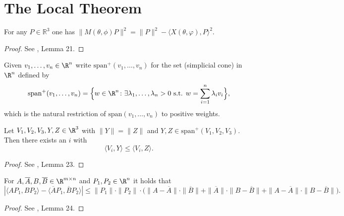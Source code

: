 \chapter{The Local Theorem}

\begin{lemma} \label{lem:pythagoras}
  \leanok
    For any $P \in \mathbb{R}^3$ one has
    $\big\|M(\theta, \phi) P\big\|^2=\|P\|^2-\langle X({\theta,\varphi}),P\rangle^2$.
\end{lemma}

\begin{proof}
\leanok
See \cite{polyhedron.without.rupert}, Lemma 21.
\end{proof}

\begin{definition} \label{def:spanp}
  \leanok
      Given $v_1, \dots, v_n \in \R^n$ write $\mathrm{span}^+(v_1,\dots,v_n)$ for the set (simplicial cone) in $\R^n$ defined by
    \[
        \mathrm{span}^+(v_1,\dots,v_n) = \Big\{ w \in \R^n \colon \exists \lambda_1,\dots,\lambda_n > 0 \text{ s.t. } w = \sum_{i=1}^n \lambda_i v_i \Big\},
    \]
    which is the natural restriction of $\mathrm{span}(v_1,\dots,v_n)$ to positive weights.
\end{definition}

\begin{lemma} \label{lem:langles}
  \leanok
Let $V_1,V_2,V_3,Y,Z \in \R^3$ with $\|Y \|=\| Z \|$ and $Y,Z \in \mathrm{span}^+(V_1,V_2,V_3)$. Then there exists an $i$ with
\[
    \langle V_i, Y \rangle \leq \langle V_i, Z \rangle.
\]
\end{lemma}

\begin{proof}
\leanok
See \cite{polyhedron.without.rupert}, Lemma 23.
\end{proof}

\begin{lemma} \label{lem:scalarprodbars}
\leanok
    For $A,\overline{A},B,\overline{B}\in \R^{m\times n}$ and $P_1,P_2\in \R^n$ it holds that
    \[
        |\langle AP_1,BP_2\rangle-\langle \overline{A}P_1,\overline{B}P_2\rangle|\leq \|P_1\|\cdot \|P_2\|\cdot \Big( \|A-\overline{A}\|\cdot \|\overline{B}\| +  \|\overline{A}\|\cdot \|B-\overline{B}\|+\|A-\overline{A}\|\cdot \|B-\overline{B}\|\Big).
    \]
\end{lemma}

\begin{proof}
\leanok
See \cite{polyhedron.without.rupert}, Lemma 24.
\end{proof}

